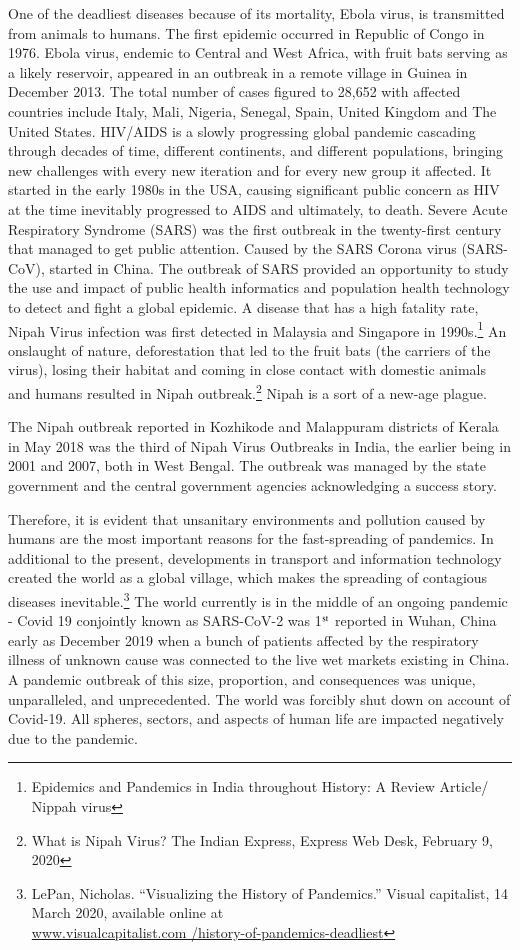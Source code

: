 \begin{multicols}{2}
\noi
One of the deadliest diseases because of its mortality, Ebola virus, is transmitted from
animals to humans. The first epidemic occurred in Republic of Congo in 1976. Ebola virus,
endemic to Central and West Africa, with fruit bats serving as a likely reservoir, appeared in
an outbreak in a remote village in Guinea in December 2013. The total number of cases
figured to 28,652 with affected countries include Italy, Mali, Nigeria, Senegal, Spain, United
Kingdom and The United States. HIV/AIDS is a slowly progressing global pandemic
cascading through decades of time, different continents, and different populations, bringing 
new challenges with every new iteration and for every new group it affected. It started in the
early 1980s in the USA, causing significant public concern as HIV at the time inevitably
progressed to AIDS and ultimately, to death. Severe Acute Respiratory Syndrome (SARS)
was the first outbreak in the twenty-first century that managed to get public attention. Caused
by the SARS Corona virus (SARS-CoV), started in China. The outbreak of SARS provided
an opportunity to study the use and impact of public health informatics and population health
technology to detect and fight a global epidemic. A disease that has a high fatality rate, Nipah
Virus infection was first detected in Malaysia and Singapore in 1990s.\footnote{ Epidemics and Pandemics in India throughout History: A Review Article/ Nippah virus} An onslaught of
nature, deforestation that led to the fruit bats (the carriers of the virus), losing their habitat
and coming in close contact with domestic animals and humans resulted in Nipah outbreak.\footnote{What is Nipah Virus? The Indian Express, Express Web Desk, February 9, 2020}
Nipah is a sort of a new-age plague.

\noi
The Nipah outbreak reported in Kozhikode and Malappuram districts of Kerala in May 2018
was the third of Nipah Virus Outbreaks in India, the earlier being in 2001 and 2007, both in
West Bengal. The outbreak was managed by the state government and the central government
agencies acknowledging a success story.

\noi
Therefore, it is evident that unsanitary environments and pollution caused by humans are the
most important reasons for the fast-spreading of pandemics. In additional to the present,
developments in transport and information technology created the world as a global village,
which makes the spreading of contagious diseases inevitable.\footnote{LePan, Nicholas. “Visualizing the History of Pandemics.” Visual capitalist, 14 March 2020, available online at\\ \url{www.visualcapitalist.com /history-of-pandemics-deadliest}} The world currently is in the middle of an ongoing pandemic - Covid 19 conjointly known as SARS-CoV-2 was 1$^{\rm st}$ reported in Wuhan, China early as December 2019 when a bunch of patients affected by the respiratory illness of unknown cause was connected to the live wet markets existing in China. A pandemic outbreak of this size, proportion, and consequences was unique, unparalleled,
and unprecedented. The world was forcibly shut down on account of Covid-19. All spheres,
sectors, and aspects of human life are impacted negatively due to the pandemic.


\end{multicols}
